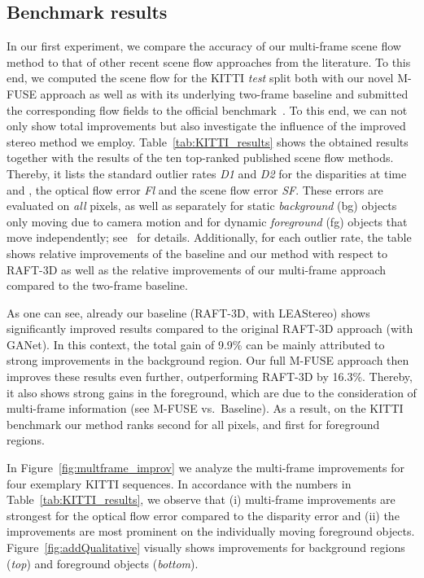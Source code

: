 \documentclass[10pt,twocolumn,letterpaper]{article}
\begin{document}
\subsection{Benchmark results}
In our first experiment, we compare the accuracy of our multi-frame scene flow method to that of other recent scene flow approaches from the literature. 
To this end, we computed the scene flow for the KITTI {\em test} split
both with our novel M-FUSE approach as well as with its underlying two-frame baseline and submitted the corresponding flow fields to the official benchmark~\cite{Menze2015_KITTI}.
To this end, we can not only show total improvements but also investigate the influence of the improved stereo method we employ.
Table~\ref{tab:KITTI_results} shows the obtained results together with the results of the ten top-ranked published scene flow methods.
Thereby, it lists the standard outlier rates 
\emph{D1} and \emph{D2} for the disparities at time  and , the optical flow error \emph{Fl} and the scene flow error \emph{SF}.
These errors are evaluated on \emph{all} pixels, as well as separately for static \emph{background} (bg) objects only moving due to camera motion and for dynamic \emph{foreground} (fg) objects that move independently;
see~\cite{Menze2015_KITTI} for details.
Additionally, for each outlier rate, the table shows relative improvements of the baseline and our method with respect to RAFT-3D as well as the relative improvements of our multi-frame approach compared to the two-frame baseline.

As one can see, already our baseline (RAFT-3D, with LEA\-Stereo) shows significantly improved results compared to the original RAFT-3D approach (with GANet).
In this context, the total gain of 9.9\% can be mainly attributed to strong improvements in the background region.
Our full \mbox{M-FUSE} approach then improves these results even further, outperforming RAFT-3D by 16.3\%.
Thereby, it also shows strong gains in the foreground, which are due to the consideration of multi-frame information (see M-FUSE vs.\ Baseline).
As a result, on the KITTI benchmark our method ranks second for all pixels, and first for foreground regions.

In Figure~\ref{fig:multframe_improv} we analyze the multi-frame improvements for four exemplary KITTI sequences.
In accordance with the numbers in Table~\ref{tab:KITTI_results}, we observe that (i) multi-frame improvements are strongest for the optical flow error compared to the disparity error and (ii) the improvements are most prominent on the individually moving foreground objects.
Figure~\ref{fig:addQualitative} visually shows improvements for background regions (\emph{top}) and foreground objects (\emph{bottom}).
\end{document}
